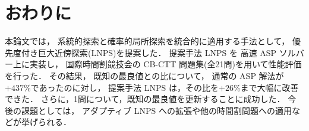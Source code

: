 \section{おわりに}

本論文では，
系統的探索と確率的局所探索を統合的に適用する手法として，
優先度付き巨大近傍探索(LNPS)を提案した．
提案手法 LNPS を 高速 ASP ソルバー{\clingo}上に実装し，
国際時間割競技会の CB-CTT 問題集(全21問)を用いて性能評価を行った．
その結果，
既知の最良値との比について，
通常の ASP 解法が$+437\%$であったのに対し，
提案手法 LNPS は，その比を$+26\%$まで大幅に改善できた．
さらに，1問について，既知の最良値を更新することに成功した．
今後の課題としては，
アダプティブ LNPS への拡張や他の時間割問題への適用などが挙げられる．


